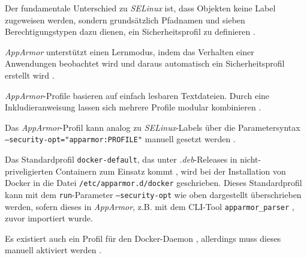 \documentclass[../main.tex]{subfiles}
\begin{document}
				Der fundamentale Unterschied zu \emph{SELinux} ist, dass Objekten keine Label zugeweisen werden, sondern grundsätzlich Pfadnamen und sieben Berechtigungstypen dazu dienen, ein Sicherheitsprofil zu definieren \cite{linuxSecOverview}\cite{apparmorQuickProfileLanguage}.


				\emph{AppArmor} unterstützt einen Lernmodus, indem das Verhalten einer Anwendungen beobachtet wird und daraus automatisch ein Sicherheitsprofil erstellt wird \cite{linuxSecOverview}.

				\emph{AppArmor}-Profile basieren auf einfach lesbaren Textdateien. Durch eine Inkludieranweisung lassen sich mehrere Profile modular kombinieren \cite{apparmorQuickProfileLanguage}.

				Das \emph{AppArmor}-Profil kann analog zu \emph{SELinux}-Labels über die Parametersyntax \texttt{--security-opt="apparmor:PROFILE"} manuell gesetzt werden \cite{dockerRun}.

				Das Standardprofil \texttt{docker-default}\cite{githubAppArmorProfileContainer}, das unter \emph{.deb}-Releases in nicht-priveligierten Containern zum Einsatz kommt \cite{docker110Security}, wird bei der Installation von Docker in die Datei \texttt{/etc/apparmor.d/docker} geschrieben. Dieses Standardprofil kann mit dem \texttt{run}-Parameter \texttt{--security-opt} wie oben dargestellt überschrieben werden, sofern dieses in \emph{AppArmor}, z.B. mit dem \acrshort{CLI}-Tool \texttt{apparmor\_parser} \cite{apparmorParser}, zuvor importiert wurde.


				Es existiert auch ein Profil für den Docker-Daemon \cite{githubAppArmorProfileDaemon}, allerdings muss dieses manuell aktiviert werden \cite{githubAppArmorDoc}.
\end{document}

